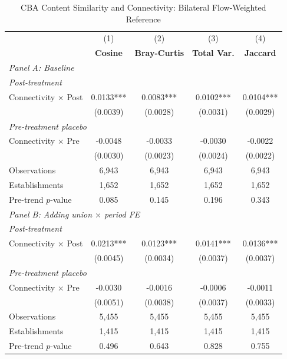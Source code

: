 \begin{table}[H]
\centering
\caption{CBA Content Similarity and Connectivity: Bilateral Flow-Weighted Reference}
\scriptsize
\setlength{\tabcolsep}{8pt}
\begin{tabular}{lcccc}
\hline\hline
 & (1) & (2) & (3) & (4) \\
 & \textbf{Cosine} & \textbf{Bray-Curtis} & \textbf{Total Var.} & \textbf{Jaccard} \\
\hline
\multicolumn{5}{l}{\textit{Panel A: Baseline}} \\
\multicolumn{5}{l}{\textit{Post-treatment}} \\
Connectivity $\times$ Post & 0.0133*** & 0.0083*** & 0.0102*** & 0.0104*** \\
 & (0.0039) & (0.0028) & (0.0031) & (0.0029) \\
\multicolumn{5}{l}{\textit{Pre-treatment placebo}} \\
Connectivity $\times$ Pre & -0.0048 & -0.0033 & -0.0030 & -0.0022 \\
 & (0.0030) & (0.0023) & (0.0024) & (0.0022) \\
\hline
Observations &        6,943 &        6,943 &        6,943 &        6,943 \\
Establishments &        1,652 &        1,652 &        1,652 &        1,652 \\
Pre-trend $p$-value & 0.085 & 0.145 & 0.196 & 0.343 \\
\hline
\multicolumn{5}{l}{\textit{Panel B: Adding union $\times$ period FE}} \\
\multicolumn{5}{l}{\textit{Post-treatment}} \\
Connectivity $\times$ Post & 0.0213*** & 0.0123*** & 0.0141*** & 0.0136*** \\
 & (0.0045) & (0.0034) & (0.0037) & (0.0037) \\
\multicolumn{5}{l}{\textit{Pre-treatment placebo}} \\
Connectivity $\times$ Pre & -0.0030 & -0.0016 & -0.0006 & -0.0011 \\
 & (0.0051) & (0.0038) & (0.0037) & (0.0033) \\
\hline
Observations &        5,455 &        5,455 &        5,455 &        5,455 \\
Establishments &        1,415 &        1,415 &        1,415 &        1,415 \\
Pre-trend $p$-value & 0.496 & 0.643 & 0.828 & 0.755 \\
\hline\hline
\end{tabular}
\begin{minipage}{\linewidth}

\end{minipage}
\end{table}
